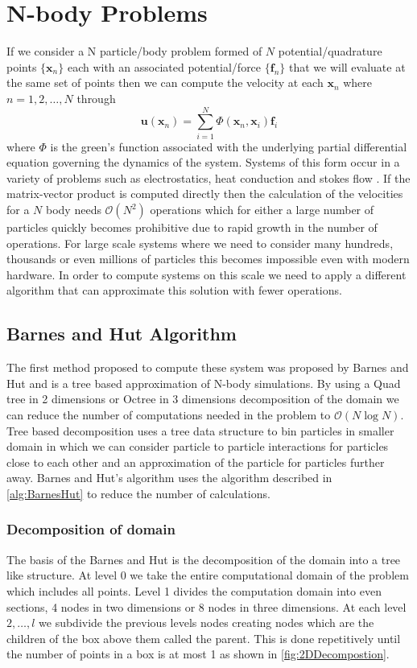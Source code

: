 \section{N-body Problems}
If we consider a N particle/body problem formed of $N$ potential/quadrature points $\{{\bm{x}}_n\}$ each with an associated potential/force $\{{\bm{f}}_n\}$ that we will evaluate at the same set of points then we can compute the velocity at each $\bm{x}_n$ where $n=1,2,\dots,N$ through
\begin{equation*}
    \bm{u}(\bm{x}_n) = \sum_{i=1}^N \Phi(\bm{x}_n,{\bm{x}}_i){\bm{f}}_i
\end{equation*}
where $\Phi$ is the green's function associated with the underlying partial differential equation governing the dynamics of the system. Systems of this form occur in a variety of problems such as electrostatics, heat conduction and stokes flow \cite{Cortez2015, Beatson, Tornberg2008, Greengard1990APotentials}. If the matrix-vector  product is computed directly then the calculation of the velocities for a $N$ body needs $\mathcal{O}(N^2)$ operations which for either a large number of particles quickly becomes prohibitive due to rapid growth in the number of operations. For large scale systems where we need to consider many hundreds, thousands or even millions of particles this becomes impossible even with modern hardware. In order to compute systems on this scale we need to apply a different algorithm that can approximate this solution with fewer operations. 

\subsection{Barnes and Hut Algorithm}
The first method proposed to compute these system was proposed by Barnes and Hut \cite{Barnes1986} and is a tree based approximation of N-body simulations. By using a Quad tree in 2 dimensions or Octree in 3 dimensions decomposition of the domain we can reduce the number of computations needed in the problem to $\mathcal{O}(N\log N)$. Tree based decomposition uses a tree data structure to bin particles in smaller domain in which we can consider particle to particle interactions for particles close to each other and an approximation of the particle for particles further away. Barnes and Hut's algorithm uses the algorithm described in \cref{alg:BarnesHut} to reduce the number of calculations. 

\subsubsection{Decomposition of domain}\label{sec:Decomposition}
The basis of the Barnes and Hut is the decomposition of the domain into a tree like structure. At level 0 we take the entire computational domain of the problem which includes all points. Level 1 divides the computation domain into even sections, 4 nodes in two dimensions or 8 nodes in  three dimensions. At each level $2,\dots,l$ we subdivide the previous levels nodes creating nodes which are the children of the box above them called the parent. This is done repetitively until the number of points in a box is at most 1 as shown in \cref{fig:2DDecompostion}.

